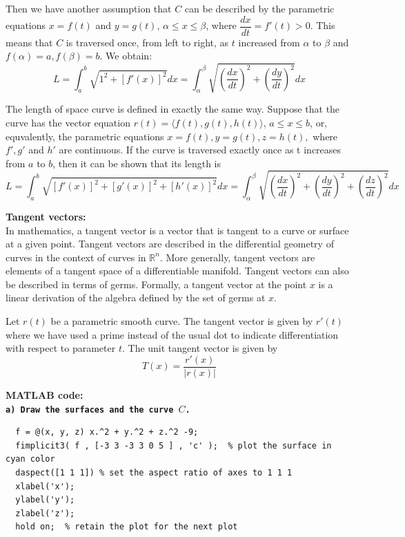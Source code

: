 Then we have another assumption that $C$ can be described by the parametric equations $x=f(t)$ and $y=g(t)$, $\alpha \leq x \leq \beta$, where \vspace{0.2cm} $\dfrac{dx}{dt}=f'(t)>0$. This means that $C$ is traversed once, from left to right, as $t$ increased from $\alpha$ to $\beta$ and $f(\alpha)=a, f(\beta)=b$. We obtain:
$$ L = \int_{a}^{b} \sqrt{1^2 + \left[f'(x)\right]^2} dx = \int_{\alpha}^{\beta} \sqrt{\left(\dfrac{dx}{dt}\right)^2 + \left(\dfrac{dy}{dt}\right)^2} dx  $$

The length of space curve is defined in exactly the same way. Suppose that the curve has the vector equation $r(t)=\langle f(t), g(t), h(t) \rangle$, $a\leq x\leq b$, or, equvalently, the parametric equations $x=f(t), y=g(t), z=h(t),$ where $f',g'$ and $h'$ are continuous. If the curve is traversed exactly once as t increases from $a$ to $b$, then it can be shown that its length is
$$ L = \int_{a}^{b} \sqrt{\left[f'(x)\right]^2 + \left[g'(x)\right]^2 + \left[h'(x)\right]^2} dx = \int_{\alpha}^{\beta} \sqrt{\left(\dfrac{dx}{dt}\right)^2 + \left(\dfrac{dy}{dt}\right)^2 + \left(\dfrac{dz}{dt}\right)^2} dx  $$

\vspace*{0.5cm}

\textbf{Tangent vectors: }\\
In mathematics, a tangent vector is a vector that is tangent to a curve or surface at a given point. Tangent vectors are described in the differential geometry of curves in the context of curves in $\mathbb{R}^n$. More generally, tangent vectors are elements of a tangent space of a differentiable manifold. Tangent vectors can also be described in terms of germs. Formally, a tangent vector at the point $x$ is a linear derivation of the algebra defined by the set of germs at $x$.

Let $r(t)$ be a parametric smooth curve. The tangent vector is given by $r'(t)$ where we have used a prime instead of the usual dot to indicate differentiation with respect to parameter $t$. The unit tangent vector is given by
$$ T(x) = \dfrac{r'(x)}{\lvert r(x) \rvert} $$

\vspace*{1cm}

\textbf{MATLAB code: }\\
\textbf{\texttt{a) Draw the surfaces and the curve $C$.} }

\begin{lstlisting}[style=Matlab-editor]
  % Plot the the surface x^2 + y^2 + z^2 = 9
  f = @(x, y, z) x.^2 + y.^2 + z.^2 -9;
  fimplicit3( f , [-3 3 -3 3 0 5 ] , 'c' );  % plot the surface in cyan color
  daspect([1 1 1]) % set the aspect ratio of axes to 1 1 1
  xlabel('x');
  ylabel('y');
  zlabel('z');
  hold on;  % retain the plot for the next plot  
\end{lstlisting}

